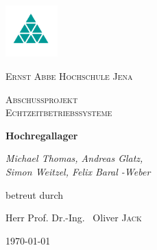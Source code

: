 \documentclass[a4paper, 12pt]{scrartcl}
\begin{document}
\begin{titlepage}
	\centering
	\includegraphics[width=0.15\textwidth]{diagrams/EAH.JPG}\par\vspace{1cm}
	{\scshape\LARGE Ernst Abbe Hochschule Jena\par}
	\vspace{1cm}
	{\scshape\Large Abschussprojekt \\ Echtzeitbetriebssysteme\par}
	\vspace{1.5cm}
	{\huge\bfseries Hochregallager\par}
	\vspace{2cm}
	{\Large\itshape Michael Thomas, Andreas Glatz,\\ Simon Weitzel, Felix Baral -Weber \par}
	\vfill
	betreut durch\par
	Herr  Prof. Dr.-Ing. ~Oliver \textsc{Jack}

	\vfill

	{\large \today\par}
\end{titlepage}

\newpage %
\thispagestyle{empty} %
\newpage %

\tableofcontents
\pagebreak

\pagebreak

\pagebreak

\pagebreak

%
\end{document}
